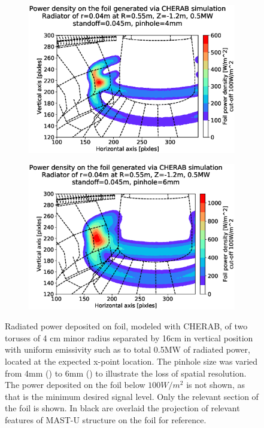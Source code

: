 \begin{figure}[!ht]
     \centering
     \begin{subfigure}{0.7\linewidth}
         \centering
         \includegraphics[trim={45 22 0 80},clip,width=\textwidth]{Chapters/chapter2/figs/measured_power_4_452x_radiator_R0.55_Z-1.2-1.3_r0.04.stl.eps}
         \caption{}
         \label{fig:pinhole_resolution4}
     \end{subfigure}
     \begin{subfigure}{0.7\linewidth}
         \centering
         \includegraphics[trim={45 22 0 80},clip,width=\textwidth]{Chapters/chapter2/figs/measured_power_6_452x_radiator_R0.55_Z-1.2-1.3_r0.04.stl.eps}
         \caption{}
         \label{fig:pinhole_resolution6}
     \end{subfigure}
	\caption{Radiated power deposited on foil, modeled with CHERAB, of two toruses of 4 cm minor radius separated by 16cm in vertical position with uniform emissivity such as to total 0.5MW of radiated power, located at the expected x-point location. The pinhole size was varied from 4mm () to 6mm () to illustrate the loss of spatial resolution. The power deposited on the foil below $100W/m^2$ is not shown, as that is the minimum desired signal level. Only the relevant section of the foil is shown. In black are overlaid the projection of relevant features of MAST-U structure on the foil for reference.}
    \label{fig:pinhole_resolution}
\end{figure}
